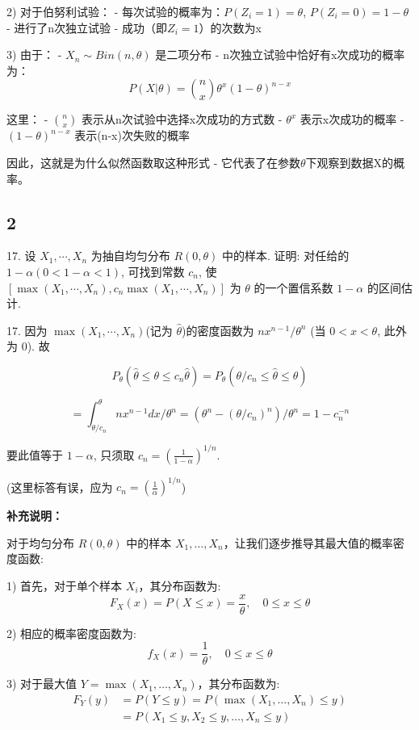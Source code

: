 \documentclass[UTF8]{report}
\theoremstyle{MyLineTheoremStyle} %
\theoremstyle{MyBlockTheoremStyle} %
\theoremstyle{MySubsubsectionStyle} %
\begin{document}
2) 对于伯努利试验：
   - 每次试验的概率为：$P(Z_i=1) = \theta$, $P(Z_i=0) = 1-\theta$
   - 进行了n次独立试验
   - 成功（即$Z_i=1$）的次数为x

3) 由于：
   - $X_n \sim Bin(n,\theta)$ 是二项分布
   - n次独立试验中恰好有x次成功的概率为：
$$
P(X|\theta) = \binom{n}{x}\theta^x(1-\theta)^{n-x}
$$

这里：
- $\binom{n}{x}$ 表示从n次试验中选择x次成功的方式数
- $\theta^x$ 表示x次成功的概率
- $(1-\theta)^{n-x}$ 表示(n-x)次失败的概率

因此，这就是为什么似然函数取这种形式 - 它代表了在参数$\theta$下观察到数据X的概率。


\subsection{2}
17. 设 $X_1,\cdots,X_n$ 为抽自均匀分布 $R(0,\theta)$ 中的样本. 证明: 对任给的 
$1-\alpha(0<1-\alpha<1)$, 可找到常数 $c_n$, 使 $[\max(X_1,\cdots,X_n), c_n\max(X_1,\cdots,X_n)]$ 为 $\theta$ 的一个置信系数 $1-\alpha$ 的区间估计.

17. 因为 $\max(X_1,\cdots,X_n)$(记为 $\hat{\theta}$)的密度函数为 $nx^{n-1}/\theta^n$ 
(当 $0<x<\theta$, 此外为 0). 故

$$P_\theta(\hat{\theta} \leqslant \theta \leqslant c_n\hat{\theta}) = P_\theta(\theta/c_n \leqslant \hat{\theta} \leqslant \theta)$$

$$= \int_{\theta/c_n}^{\theta} nx^{n-1}dx/\theta^n = (\theta^n - (\theta/c_n)^n)/\theta^n = 1-c_n^{-n}$$

要此值等于 $1-\alpha$, 只须取 $c_n = \left(\frac{1}{1-\alpha}\right)^{1/n}$.

(这里标答有误，应为 $c_n = \left(\frac{1}{\alpha}\right)^{1/n}$)

\textbf{补充说明：}

对于均匀分布 $R(0,\theta)$ 中的样本 $X_1,\ldots,X_n$，让我们逐步推导其最大值的概率密度函数:

1) 首先，对于单个样本 $X_i$，其分布函数为:
   $$F_X(x) = P(X \leqslant x) = \frac{x}{\theta}, \quad 0 \leqslant x \leqslant \theta$$
   
2) 相应的概率密度函数为:
   $$f_X(x) = \frac{1}{\theta}, \quad 0 \leqslant x \leqslant \theta$$

3) 对于最大值 $Y = \max(X_1,\ldots,X_n)$，其分布函数为:
   $$\begin{aligned}
   F_Y(y) &= P(Y \leqslant y) = P(\max(X_1,\ldots,X_n) \leqslant y) \\
   &= P(X_1 \leqslant y, X_2 \leqslant y, \ldots, X_n \leqslant y)
   \end{aligned}$$
\end{document}
